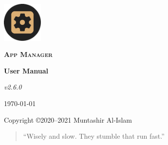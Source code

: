 \begin{titlingpage}
    \pagecolor{SunTan}
    \begin{center}
        \includegraphics[width=2cm]{images/icon}\par\vspace{1cm}
        {\Huge\textbf{\textsc{App Manager}}\par}
        \vspace{2.5cm}
        {\huge\bfseries User Manual\par}
        \vspace{.5cm}
        {\Large\itshape v2.6.0\par}
        \vfill
        {\large \today\par}
        \vfill
        {Copyright \copyright 2020--2021 Muntashir Al-Islam\par}
        \pagebreak
        \pagecolor{white}
        \begin{quotation}
            ``Wisely and slow. They stumble that run fast.''
        \end{quotation}
    \end{center}
\end{titlingpage}
